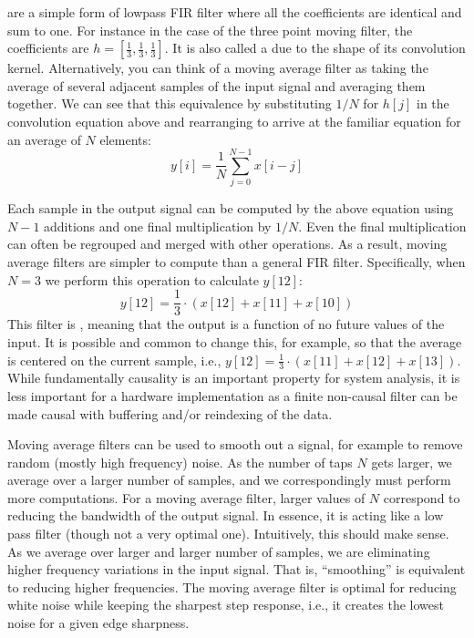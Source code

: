  are a simple form of lowpass FIR filter where all the coefficients are identical and sum to one. For instance in the case of the three point moving filter, the coefficients are $h = [\frac{1}{3}, \frac{1}{3}, \frac{1}{3}]$.  It is also called a  due to the shape of its convolution kernel.  Alternatively, you can think of a moving average filter as taking the average of several adjacent samples of the input signal and averaging them together. We can see that this equivalence by substituting $1/N$ for $h[j]$ in the convolution equation above and rearranging to arrive at the familiar equation for an average of $N$ elements:
\begin{equation}
y[i] = \frac{1}{N} \displaystyle\sum\limits_{j=0}^{N-1} x[i-j]
\end{equation}

Each sample in the output signal can be computed by the above equation using $N-1$ additions and one final multiplication by $1/N$.  Even the final multiplication can often be regrouped and merged with other operations.  As a result, moving average filters are simpler to compute than a general FIR filter.  Specifically, when $N = 3$ we perform this operation to calculate $y[12]$:
\begin{equation}
y[12] = \frac{1}{3} \cdot (x[12] + x[11] + x[10])
\end{equation}
This filter is , meaning that the output is a function of no future values of the input. It is possible and common to change this, for example, so that the average is centered on the current sample, i.e., $y[12] = \frac{1}{3} \cdot (x[11] + x[12] + x[13])$. While fundamentally causality is an important property for system analysis, it is less important for a hardware implementation as a finite non-causal filter can be made causal with buffering and/or reindexing of the data.

Moving average filters can be used to smooth out a signal, for example to remove random (mostly high frequency) noise.   As the number of taps $N$ gets larger, we average over a larger number of samples, and we correspondingly must perform more computations. For a moving average filter, larger values of $N$ correspond to reducing the bandwidth of the output signal. In essence, it is acting like a low pass filter (though not a very optimal one). Intuitively, this should make sense. As we average over larger and larger number of samples, we are eliminating higher frequency variations in the input signal. That is, ``smoothing'' is equivalent to reducing higher frequencies. The moving average filter is optimal for reducing white noise while keeping the sharpest step response, i.e., it creates the lowest noise for a given edge sharpness.

